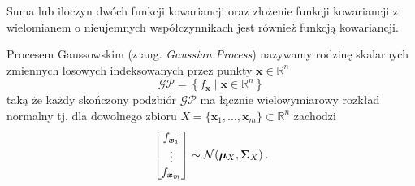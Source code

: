 \documentclass{myclass}
\numberwithin{equation}{subsection}
\begin{document}
\begin{theorem}
Suma lub iloczyn dwóch funkcji kowariancji oraz złożenie funkcji kowariancji z wielomianem o
nieujemnych współczynnikach jest również funkcją kowariancji.
\end{theorem}

\begin{definition}
Procesem Gaussowskim (z ang. \textit{Gaussian Process}) nazywamy rodzinę skalarnych zmiennych
losowych indeksowanych przez punkty \(\bm{x} \in \mathbb{R}^n\)
\begin{equation*}
    \mathcal{GP} = \left\{f_{\bm{x}} \mid \bm{x} \in \mathbb{R}^n\right\}
\end{equation*}
taką że każdy skończony podzbiór \(\mathcal{GP}\) ma łącznie wielowymiarowy rozkład normalny tj. dla
dowolnego zbioru \(X = \{\bm{x}_1, \ldots, \bm{x}_m\} \subset \mathbb{R}^n\) zachodzi
\begin{equation*}
    \mqty[f_{\bm{x}_1} \\ \vdots \\ f_{\bm{x}_m}] \sim \mathcal{N}(\bm{\mu}_X, \bm{\Sigma}_{X})\,.
\end{equation*}
\end{definition}
\end{document}
